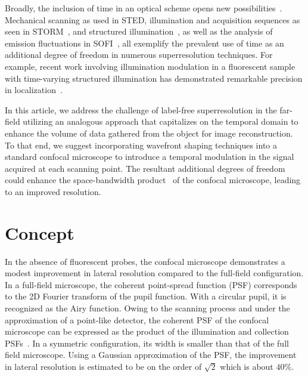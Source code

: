 \documentclass[%
reprint,
 amsmath,amssymb,
 aps,
]{revtex4-2}
\begin{document}
Broadly, the inclusion of time in an optical scheme opens new possibilities~\cite{4DopticsEngheta}.
Mechanical scanning as used in STED, %
illumination and acquisition sequences as seen in STORM~\cite{STORM}, and structured illumination~\cite{StructuredIll}, as well as the analysis of emission fluctuations in SOFI~\cite{SOFI}, all exemplify the prevalent use of time as an additional degree of freedom in numerous superresolution techniques. %
For example, recent work involving illumination modulation in a fluorescent sample with time-varying structured illumination has demonstrated remarkable precision in localization~\cite{ModLoc}.

In this article, we address the challenge of label-free superresolution in the far-field utilizing an
analogous approach that capitalizes on the temporal domain to enhance the volume of data gathered from the object for image reconstruction. To that end, we suggest incorporating wavefront shaping techniques into a standard confocal microscope to introduce a temporal modulation in the signal acquired at each scanning point. The resultant additional degrees of freedom could %
enhance the space-bandwidth product~\cite{SBproductLohmann} of the confocal microscope, leading to an improved resolution.

\section*{Concept}

In the absence of fluorescent probes, the confocal microscope demonstrates a modest improvement in lateral resolution compared to the full-field configuration. In a full-field microscope, the coherent point-spread function (PSF) corresponds to the 2D Fourier transform of the pupil function. With a circular pupil, it is recognized as the Airy function. Owing to the scanning process and under the approximation of a point-like detector, the coherent PSF of the confocal microscope can be expressed as the product of the illumination and collection PSFs~\cite{JMertz}. In a symmetric configuration, its  width is smaller than that of the full field microscope. Using a Gaussian approximation of the PSF, the improvement in lateral resolution is estimated to be on the order of $\sqrt{2}$ which is about $40\%$.
\end{document}
